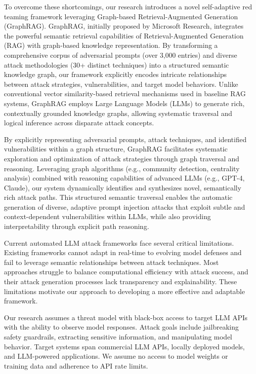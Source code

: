 To overcome these shortcomings, our research introduces a novel self-adaptive red teaming framework leveraging Graph-based Retrieval-Augmented Generation (GraphRAG). GraphRAG, initially proposed by Microsoft Research, integrates the powerful semantic retrieval capabilities of Retrieval-Augmented Generation (RAG) with graph-based knowledge representation. By transforming a comprehensive corpus of adversarial prompts (over 3,000 entries) and diverse attack methodologies (30+ distinct techniques) into a structured semantic knowledge graph, our framework explicitly encodes intricate relationships between attack strategies, vulnerabilities, and target model behaviors. Unlike conventional vector similarity-based retrieval mechanisms used in baseline RAG systems, GraphRAG employs Large Language Models (LLMs) to generate rich, contextually grounded knowledge graphs, allowing systematic traversal and logical inference across disparate attack concepts.

By explicitly representing adversarial prompts, attack techniques, and identified vulnerabilities within a graph structure, GraphRAG facilitates systematic exploration and optimization of attack strategies through graph traversal and reasoning. Leveraging graph algorithms (e.g., community detection, centrality analysis) combined with reasoning capabilities of advanced LLMs (e.g., GPT-4, Claude), our system dynamically identifies and synthesizes novel, semantically rich attack paths. This structured semantic traversal enables the automatic generation of diverse, adaptive prompt injection attacks that exploit subtle and context-dependent vulnerabilities within LLMs, while also providing interpretability through explicit path reasoning.

Current automated LLM attack frameworks face several critical limitations. Existing frameworks cannot adapt in real-time to evolving model defenses and fail to leverage semantic relationships between attack techniques. Most approaches struggle to balance computational efficiency with attack success, and their attack generation processes lack transparency and explainability. These limitations motivate our approach to developing a more effective and adaptable framework.

Our research assumes a threat model with black-box access to target LLM APIs with the ability to observe model responses. Attack goals include jailbreaking safety guardrails, extracting sensitive information, and manipulating model behavior. Target systems span commercial LLM APIs, locally deployed models, and LLM-powered applications. We assume no access to model weights or training data and adherence to API rate limits.

